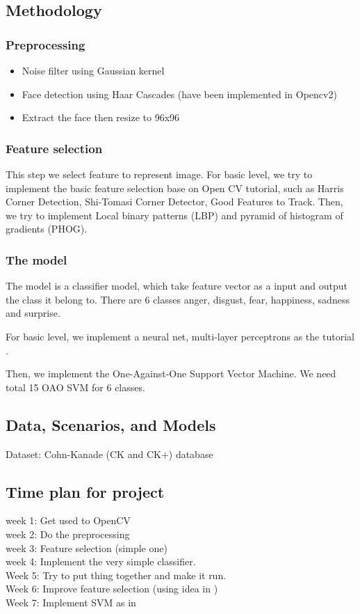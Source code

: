 \documentclass[a4paper, 12pt]{article}
\begin{document}
\subsection{Methodology}
\subsubsection{Preprocessing}
\begin{itemize}
	\item Noise filter using Gaussian kernel
	\item Face detection using Haar Cascades (have been implemented in Opencv2) \cite{Haar}
	\item Extract the face then resize to 96x96
\end{itemize}
\subsubsection{Feature selection}
	This step we select feature to represent image. 
	For basic level, we try to implement the basic feature selection base on Open CV tutorial, such as Harris Corner Detection, Shi-Tomasi Corner Detector, Good Features to Track. 
	Then, we try to implement Local binary patterns (LBP) and pyramid of histogram of gradients (PHOG). 
	
\subsubsection{The model}
	The model is a classifier model, which take feature vector as a input and output the class it belong to. There are 6 classes anger, disgust, fear, happiness, sadness and surprise.
	
	For basic level, we implement a neural net, multi-layer perceptrons as the tutorial \cite{mlp}.
	
	Then, we implement the One-Against-One Support Vector Machine. We need total 15 OAO SVM for 6 classes.
	

\subsection{Data, Scenarios, and Models}
Dataset: Cohn-Kanade (CK and CK+) database \cite{5543262}

\subsection{Time plan for project}
week 1: Get used to OpenCV\\
week 2: Do the preprocessing \\
week 3: Feature selection (simple one)\\
week 4: Implement the very simple classifier. \\
Week 5: Try to put thing together and make it run. \\
Week 6: Improve feature selection (using idea in \cite{7050661} ) \\
Week 7: Implement SVM as in \cite{7050661}\\



\end{document}
